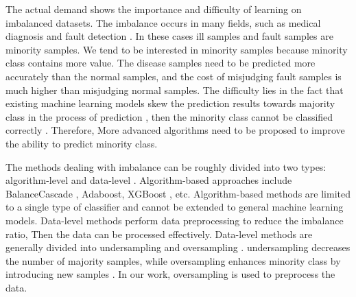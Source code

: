 \documentclass[ida]{iosart2x}
\begin{document}
The actual demand shows the importance and difficulty of learning on imbalanced datasets.
The imbalance occurs in many fields, such as medical 
diagnosis \cite{2013Computational,2019Electrocardiogram} and fault detection \cite{2018Imbalanced}.
In these cases ill samples and fault samples are minority samples.
We tend to be interested in minority samples because minority class contains more value. 
The disease samples need to be predicted more accurately than the normal samples, 
and the cost of misjudging fault samples is much higher than misjudging normal samples.
The difficulty %
lies in the fact that existing machine 
learning models skew the prediction results towards 
majority class in the process of prediction \cite{Victoria2013An}, then 
the minority class cannot be classified correctly \cite{2016A}. 
Therefore, More advanced algorithms need to 
be proposed to improve the ability to predict minority class.

The methods dealing with imbalance can be roughly
divided into two types: algorithm-level \cite{2007Highcost-sensitive} and data-level \cite{2002SMOTE}.
Algorithm-based approaches include BalanceCascade \cite{2019Class}, Adaboost, 
XGBoost \cite{Chen_2016}, etc. 
Algorithm-based methods are limited 
to a single type of classifier \cite{2020Combined} and 
cannot be extended to general machine learning models.
Data-level methods perform data preprocessing to reduce the imbalance ratio, Then 
the data can be processed effectively.
Data-level methods are generally divided into undersampling \cite{2015Undersampled} 
and oversampling \cite{2002SMOTE}. 
undersampling decreases the number of majority samples, %
while oversampling enhances minority class by introducing new samples \cite{2010A}.
In our work, oversampling is used to preprocess the data.
\end{document}
